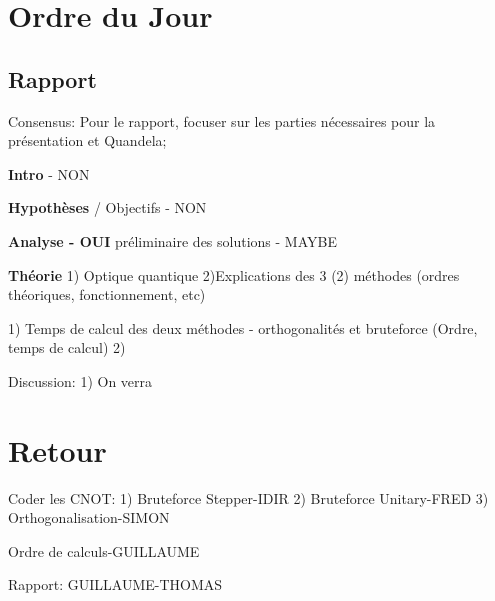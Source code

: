 \documentclass[letterpaper,12pt,oneside,final]{article}
\begin{document}
\section*{Ordre du Jour} 
\subsection*{Rapport} 
Consensus: Pour le rapport, focuser sur les parties nécessaires pour la présentation et 
Quandela;
\item \textbf{Intro} - NON
\item \textbf{Hypothèses} / Objectifs - NON
\item \textbf{Analyse - OUI} préliminaire des solutions - MAYBE
\item \textbf{Théorie} 1) Optique quantique  2)Explications des 3 (2) méthodes (ordres théoriques, fonctionnement, etc)
\item {} 1) Temps de calcul des deux méthodes - orthogonalités et bruteforce (Ordre, temps de calcul)
2) 
\item {Discussion:} 1) On verra 
\item \textbf{} 

\section*{Retour} 
\item Coder les CNOT: 1) Bruteforce Stepper-IDIR 2) Bruteforce Unitary-FRED 3) Orthogonalisation-SIMON
\item Ordre de calculs-GUILLAUME 
\item Rapport: GUILLAUME-THOMAS
\end{document}
